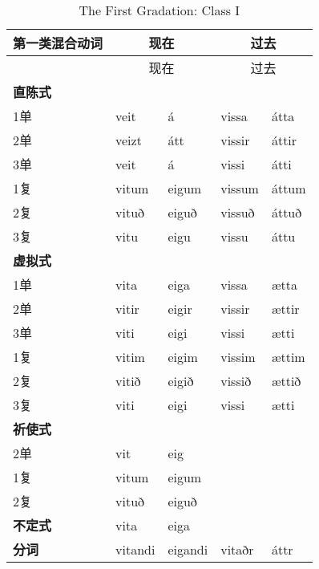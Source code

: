 \begin{longtable}{lllll}
  \caption[The First Gradation: Class I]{The First Gradation: Class
    I}\tabularnewline
  \toprule
  第一类混合动词      & \multicolumn{2}{c}{现在} & \multicolumn{2}{c}{过去}                  \\\midrule\endfirsthead{} &\multicolumn{2}{c}{现在} &\multicolumn{2}{c}{过去} \\
  \midrule
  \endhead
  \bottomrule
  \endfoot
  \textbf{直陈式} & ~                      & ~                      & ~      & ~     \\
  1单           & veit                   & á                      & vissa  & átta  \\
  2单           & veizt                  & átt                    & vissir & áttir \\
  3单           & veit                   & á                      & vissi  & átti  \\
  1复           & vitum                  & eigum                  & vissum & áttum \\
  2复           & vituð                  & eiguð                  & vissuð & áttuð \\
  3复           & vitu                   & eigu                   & vissu  & áttu  \\
  \textbf{虚拟式} & ~                      & ~                      & ~      & ~     \\
  1单           & vita                   & eiga                   & vissa  & ætta  \\
  2单           & vitir                  & eigir                  & vissir & ættir \\
  3单           & viti                   & eigi                   & vissi  & ætti  \\
  1复           & vitim                  & eigim                  & vissim & ættim \\
  2复           & vitið                  & eigið                  & vissið & ættið \\
  3复           & viti                   & eigi                   & vissi  & ætti  \\
  \textbf{祈使式} & ~                      & ~                      & ~      & ~     \\
  2单           & vit                    & eig                    & ~      & ~     \\
  1复           & vitum                  & eigum                  & ~      & ~     \\
  2复           & vituð                  & eiguð                  & ~      & ~     \\
  \textbf{不定式} & vita                   & eiga                   & ~      & ~     \\
  \textbf{分词}  & vitandi                & eigandi                & vitaðr & áttr  \\
\end{longtable}

